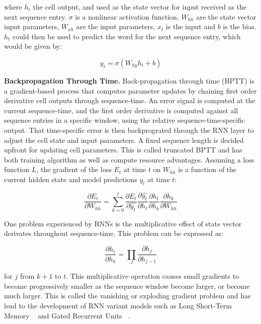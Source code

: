 where $h_t$ the cell output, and used as the state vector for input received as the next sequence entry. $\sigma$ is a nonlinear activation function, $W_{hh}$ are the state vector input parameters, $W_{xh}$ are the input parameters, $x_t$ is the input and $b$ is the bias. $h_t$ could then be used to predict the word for the next sequence entry, which would be given by:

\begin{equation}
	y_t = \sigma(W_{hy}h_{t} + b)
\end{equation}

\textbf{Backpropagation Through Time.} Back-propagation through time (BPTT) is a gradient-based process that computes parameter updates by chaining first order derivative cell outputs through sequence-time. An error signal is computed at the current sequence-time, and the first order derivative is computed against all sequence entries in a specific window, using the relative sequence-time-specific output. That time-specific error is then backprograted through the RNN layer to adjust the cell state and input parameters. A fixed sequence length is decided upfront for updating cell parameters. This is called truncated BPTT and has both training algorithm as well as compute resource advantages. \newpage
Assuming a loss function $L$, the gradient of the loss $E_t$ at time $t$ on $W_{hh}$ is a function of the current hidden state and model predictions $\hat{y_t}$ at time $t$:  

\begin{equation}
	\frac{\partial E_t} {\partial W_{hh}} = \sum_{k=0}^{t}\frac{\partial E_t} {\partial \hat{y_t}}\frac{\partial \hat{y_t}} {\partial h_t}\frac{\partial h_t} {\partial h_k}\frac{\partial h_k} {\partial W_{hh}}
\end{equation}

One problem experienced by RNNs is the multiplicative effect of state vector derivates throughout sequence-time. This problem can be expressed as:

\begin{equation}
	\frac{\partial h_t} {\partial h_k} = \prod_J\frac{\partial h_j} {\partial h_{j-1}}
\end{equation}

for $j$ from $k + 1$ to $t$. This multiplicative operation causes small gradients to become progressively smaller as the sequence window become larger, or become much larger. This is called the vanishing or exploding gradient problem and has lead to the development of RNN variant models such as Long Short-Term Memory ~\citep{hochreiter1997long} and Gated Recurrent Units ~\citep{cho2014learning}.


